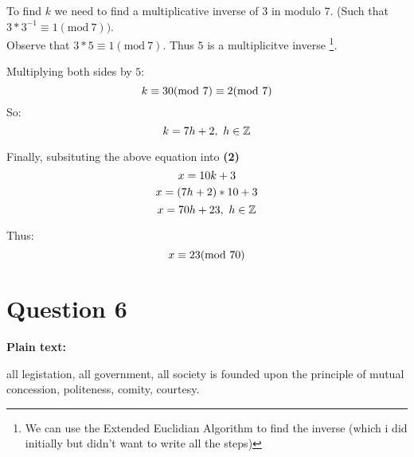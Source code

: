 \documentclass{article}
\numberwithin{equation}{subsection}
\begin{document}
\begin{enumerate}[(a)]
{\begin{adjustwidth}{10pt}{}
				To find $k$ we need to find a multiplicative inverse of 3 in modulo 7. 
				(Such that $3*3^{-1} \equiv 1(\textrm{mod}\ 7))$.\\ Observe that $3*5 \equiv 1(\textrm{mod}\ 7)$.
				Thus $5$ is a multiplicitve inverse \footnote{We can use the Extended Euclidian Algorithm to find
				the inverse (which i did initially but didn't want to write all the steps)}.

				\vspace{10pt}
				Multiplying both sides by $5$:
				\begin{equation}\notag
					k \equiv 30 (\textrm{mod}\ 7) \equiv 2 (\textrm{mod}\ 7)	
				\end{equation}
				So:
				\begin{equation}\notag
					k = 7h + 2, \ h\in \mathbb{Z}	
				\end{equation}

				Finally, subsituting the above equation into \textbf{(2)}
				\begin{equation}\notag
					x = 10k +3	
				\end{equation}
				\begin{equation}\notag
					x = (7h+2)*10 + 3
				\end{equation}
				\begin{equation}\notag
					x = 70h + 23, \ h \in \mathbb{Z}	
				\end{equation}

				Thus:
				\begin{equation}\notag
					x \equiv 23 (\textrm{mod}\ 70)	
				\end{equation}
				\end{adjustwidth}
		}

	\end{enumerate}


	\newpage
	\thispagestyle{fancy}
	\section*{Question 6}

	\textbf{Plain text:}
	\par{
		all legistation, all government, all society is founded upon the principle
		of mutual concession, politeness, comity, courtesy.
	}
\end{document}
